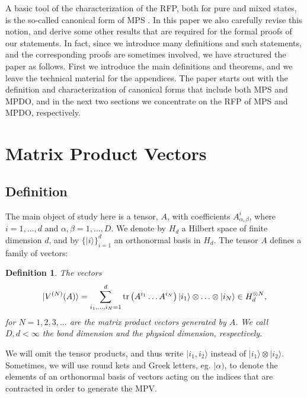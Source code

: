 \documentclass{elsarticle}
\newcommand{\be}{\begin{equation}}
\newcommand{\ee}{\end{equation}}
\newtheorem{defn}[thm]{Definition}
\begin{document}
A basic tool of the characterization of the RFP, both for pure and mixed states, is
the so-called canonical form of MPS \cite{David2006}. In this paper we also carefully
revise this notion, and derive some other results that are required for the
formal proofs of our statements. In fact, since we introduce many definitions and
such statements, and the corresponding proofs are sometimes involved, we have
structured the paper as follows. First we introduce the main definitions and
theorems, and we leave the technical material for the appendices. The paper
starts out with the definition and characterization of canonical forms that include
both MPS and MPDO, and in the next two sections we concentrate on the RFP of MPS and MPDO,
respectively.

\section{Matrix Product Vectors}\label{Sec:MPV}

\subsection{Definition}

The main object of study here is a tensor, $A$, with coefficients $A^i_{\alpha,\beta}$, where $i=1,\ldots,d$ and $\alpha,\beta=1,\ldots,D$. We denote by $H_d$ a Hilbert space of finite dimension $d$, and by $\{|i\rangle\}_{i=1}^d$ an orthonormal basis in $H_d$. The tensor $A$ defines a family of vectors:

\begin{defn}
    The vectors
    \be
        \label{MPV}
        |V^{(N)}(A)\rangle = \sum_{i_1,\ldots,i_N=1}^d {\rm tr}\left( A^{i_1}\ldots  A^{i_N}\right) |i_1\rangle\otimes\ldots\otimes|i_N\rangle \in H_d^{\otimes N},
    \ee
    for $N=1,2,3,\ldots$ are the {\em matrix product vectors generated} by $A$. We call $D,d<\infty$ the {\em bond dimension} and the {\em physical dimension}, respectively.
\end{defn}

We will omit the tensor products, and thus write $|i_1,i_2\rangle$ instead of $|i_1\rangle\otimes|i_2\rangle$. Sometimes, we will use round kets and Greek letters, eg. $|\alpha)$, to denote the elements of an orthonormal basis of vectors acting on the indices that are contracted in order to generate the MPV.
\end{document}
